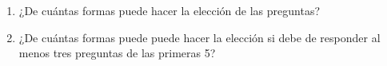 \documentclass[12pt,a4paper]{report}
\begin{document}
\begin{enumerate}
{	\begin{enumerate}
   \item {
   ¿De cuántas formas puede hacer la elección de las preguntas?\\

   }

   \item {
   ¿De cuántas formas puede puede hacer la elección si debe de responder
   al menos tres preguntas de las primeras 5?\\

   }
	\end{enumerate}
    }
\end{enumerate}
\end{document}
